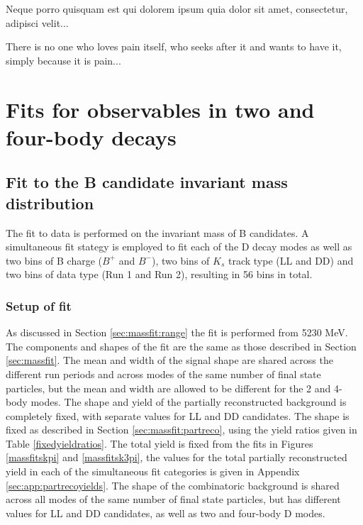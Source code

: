 \clearpage
\begin{savequote}[8cm]
\textlatin{Neque porro quisquam est qui dolorem ipsum quia dolor sit amet, consectetur, adipisci velit...}

There is no one who loves pain itself, who seeks after it and wants to have it, simply because it is pain...
\end{savequote}

\chapter{\label{ch:7-cpfit}Fits for \CP observables in two and four-body decays} 

\minitoc

\section{Fit to the B candidate invariant mass distribution}
\label{sec:cpfit}

The fit to data is performed on the invariant mass of B candidates. A simultaneous fit stategy is employed to fit each of the D decay modes as well as two bins of B charge ($B^+$ and $B^-$), two bins of $K_s$ track type (LL and DD) and two bins of data type (Run 1 and Run 2), resulting in 56 bins in total.

\subsection{Setup of \CP fit}

As discussed in Section \ref{sec:massfit:range} the \CP fit is performed from 5230 MeV. The components and shapes of the \CP fit are the same as those described in Section \ref{sec:massfit}. The mean and width of the signal shape are shared across the different run periods and across modes of the same number of final state particles, but the mean and width are allowed to be different for the 2 and 4-body modes. The shape and yield of the partially reconstructed background is completely fixed, with separate values for LL and DD candidates. The shape is fixed as described in Section \ref{sec:massfit:partreco}, using the yield ratios given in Table \ref{fixedyieldratios}. The total yield is fixed from the fits in Figures \ref{massfitskpi} and \ref{massfitsk3pi}, the values for the total partially reconstructed yield in each of the simultaneous fit categories is given in Appendix \ref{sec:app:partrecoyields}. The shape of the combinatoric background is shared across all modes of the same number of final state particles, but has different values for LL and DD candidates, as well as two and four-body D modes.


